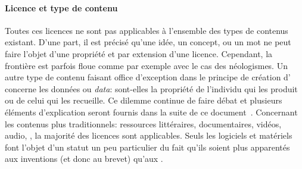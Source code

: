         \paragraph{Licence et type de contenu}
            \strut{}
                Toutes ces licences ne sont pas applicables à l'ensemble des types de contenus existant. D'une part, il est précisé qu'une idée, un concept, ou un mot ne peut faire l'objet d'une propriété et par extension d'une licence. Cependant, la frontière est parfois floue comme par exemple avec le cas des néologismes. 
                Un autre type de contenu faisant office d'exception dans le principe de création d' concerne les données ou \textit{data}: sont-elles la propriété de l'individu qui les produit ou de celui qui les recueille. Ce dilemme continue de faire débat et plusieurs éléments d'explication seront fournis dans la suite de ce document~.
                Concernant les contenus plus traditionnels: ressources littéraires, documentaires, vidéos, audio, \etc, la majorité des licences sont applicables. 
                Seuls les logiciels et matériels font l'objet d'un statut un peu particulier du fait qu'ils soient plus apparentés aux inventions (et donc au brevet) qu'aux . 
